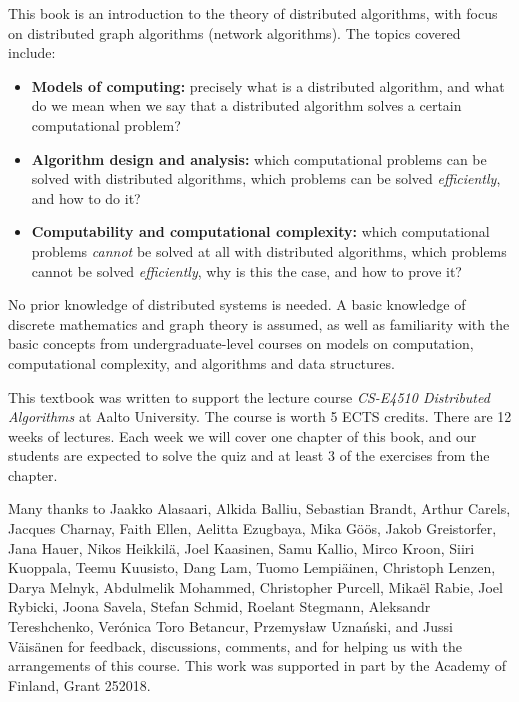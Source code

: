 
This book is an introduction to the theory of distributed algorithms, with focus on distributed graph algorithms (network algorithms). The topics covered include:
\begin{itemize}
    \item \textbf{Models of computing:} precisely what is a distributed algorithm, and what do we mean when we say that a distributed algorithm solves a certain computational problem?
    \item \textbf{Algorithm design and analysis:} which computational problems can be solved with distributed algorithms, which problems can be solved \emph{efficiently}, and how to do it?
    \item \textbf{Computability and computational complexity:} which computational problems \emph{cannot} be solved at all with distributed algorithms, which problems cannot be solved \emph{efficiently}, why is this the case, and how to prove it?
\end{itemize}
No prior knowledge of distributed systems is needed. A basic knowledge of discrete mathematics and graph theory is assumed, as well as familiarity with the basic concepts from undergraduate-level courses on models on computation, computational complexity, and algorithms and data structures.



This textbook was written to support the lecture course \emph{CS-E4510 Distributed Algorithms} at Aalto University. The course is worth 5 ECTS credits. There are 12 weeks of lectures. Each week we will cover one chapter of this book, and our students are expected to solve the quiz and at least 3 of the exercises from the chapter.



Many thanks to
Jaak\-ko Ala\-saari,
Alki\-da Balliu,
Sebastian Brandt,
Arthur Carels,
Jacques Charnay,
Faith Ellen,
Aelitta Ezugbaya,
Mika G\"o\"os,
Ja\-kob Greistorfer,
Jana Hauer,
Nikos Heik\-kil\"a,
Joel Kaa\-si\-nen,
Samu Kal\-lio,
Mir\-co Kroon,
Siiri Kuop\-pala,
Tee\-mu Kuu\-sisto,
Dang Lam,
Tuo\-mo Lem\-pi\"a\-inen,
Christoph Len\-zen,
Darya Melnyk,
Abdul\-melik Mohammed,
Christopher Purcell,
Mika\"el Rabie,
Joel Ry\-bicki,
Joo\-na Sa\-ve\-la,
Stefan Schmid,
Roelant Steg\-mann,
Aleksandr Tereshchenko,
Verónica Toro Betancur,
Przemys\l{}aw Uzna\'nski,
and
Jussi V\"ai\-s\"a\-nen
for feedback, discussions, comments, and for helping us with the arrangements of this course. This work was supported in part by the Academy of Finland, Grant 252018.


